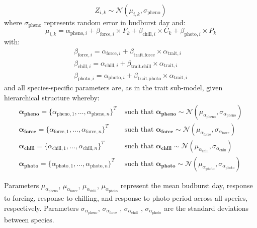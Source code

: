 \documentclass{article}\usepackage[]{graphicx}\usepackage[]{color}
\begin{document}
\begin{equation}
\label{phen_main}
Z_{i,k}  \sim \mathcal{N}( \mu_{i,k}, \sigma_{\text{pheno}})
\end{equation}
where $\sigma_{\text{pheno}}$ represents random error in budburst day and:
\begin{equation}
\label{phen_main2}
\mu_{i,k} = \alpha_{\text{pheno},i}+\beta_{\text{force},i} \times F_k + \beta_{\text{chill},i} \times C_k + \beta_{\text{photo},i} \times P_k
\end{equation}
with:
\begin{align}
\label{betaEq}
\beta_{\text{force},i} = \alpha_{\text{force},i} + \beta_{\text{trait}.\text{force}} \times \alpha_{\text{trait},i} \\
\beta_{\text{chill},i} = \alpha_{\text{chill},i} + \beta_{\text{trait}.\text{chill}} \times \alpha_{\text{trait},i} \nonumber \\
\beta_{\text{photo},i} = \alpha_{\text{photo},i} + \beta_{\text{trait}.\text{photo}} \times \alpha_{\text{trait},i} \nonumber 
\end{align} 
and all species-specific parameters are, as in the trait sub-model, given hierarchical structure whereby:
\begin{align}
\boldsymbol{\alpha_{\text{pheno}}} = \{\alpha_{\text{pheno},1}, \ldots, \alpha_{\text{pheno},n}\}^T & \text{ such that }
  \boldsymbol{\alpha_{\text{pheno}}} \sim \mathcal{N}(\mu_{\alpha_{\text{pheno}}},\sigma_{\alpha_{\text{pheno}}}) \\
\boldsymbol{\alpha_{\text{force}}} = \{\alpha_{\text{force},1}, \ldots, \alpha_{\text{force},n}\}^T & \text{ such that }
  \boldsymbol{\alpha_{\text{force}}} \sim \mathcal{N}(\mu_{\alpha_{\text{force}}},\sigma_{\alpha_{\text{force}}}) \nonumber \\
\boldsymbol{\alpha_{\text{chill}}} = \{\alpha_{\text{chill},1}, \ldots, \alpha_{\text{chill},n}\}^T & \text{ such that }
  \boldsymbol{\alpha_{\text{chill}}} \sim \mathcal{N}(\mu_{\alpha_{\text{chill}}},\sigma_{\alpha_{\text{chill}}}) \nonumber \\
\boldsymbol{\alpha_{\text{photo}}} = \{\alpha_{\text{photo},1}, \ldots, \alpha_{\text{photo},n}\}^T & \text{ such that }
  \boldsymbol{\alpha_{\text{photo}}} \sim \mathcal{N}(\mu_{\alpha_{\text{photo}}},\sigma_{\alpha_{\text{photo}}}) \nonumber
\end{align}

Parameters $\mu_{\alpha_{\text{pheno}}}$, $\mu_{\alpha_{\text{force}}}$, $\mu_{\alpha_{\text{chill}}}$, $\mu_{\alpha_{\text{photo}}}$ represent the mean budburst day, response to forcing, response to chilling, and response to photo period across all species, respectively. Parameters $\sigma_{\alpha_{\text{pheno}}}$, $\sigma_{\alpha_{\text{force}}}$ , $\sigma_{\alpha_{\text{chill}}}$ , $\sigma_{\alpha_{\text{photo}}}$ are the standard deviations between species.
\end{document}

